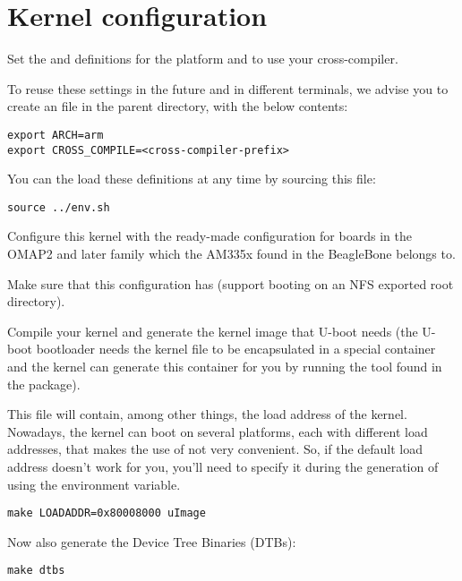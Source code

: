 \section{Kernel configuration}

Set the  and  definitions for the 
platform and to use your cross-compiler.

To reuse these settings in the future and in different terminals,
we advise you to create an  file in the parent directory,
with the below contents:

\begin{verbatim}
export ARCH=arm
export CROSS_COMPILE=<cross-compiler-prefix>
\end{verbatim}

You can the load these definitions at any time by sourcing this file:

\begin{verbatim}
source ../env.sh
\end{verbatim}
 
Configure this kernel with the ready-made configuration for boards in
the OMAP2 and later family which the AM335x found in the BeagleBone
belongs to.

Make sure that this configuration has  (support
booting on an NFS exported root directory).

Compile your kernel and generate the  kernel image that
U-boot needs (the U-boot bootloader needs the kernel 
file to be encapsulated in a special container and the kernel
 can generate this container for you by running the
 tool found in the  package).

This file will contain, among other things, the load address of the
kernel. Nowadays, the kernel can boot on several platforms, each with
different load addresses, that makes the use of  not very
convenient. So, if the default load address doesn't work for you, you'll
need to specify it during the generation of  using the
 environment variable.

\begin{verbatim}
make LOADADDR=0x80008000 uImage
\end{verbatim}

Now also generate the Device Tree Binaries (DTBs):

\begin{verbatim}
make dtbs
\end{verbatim}

